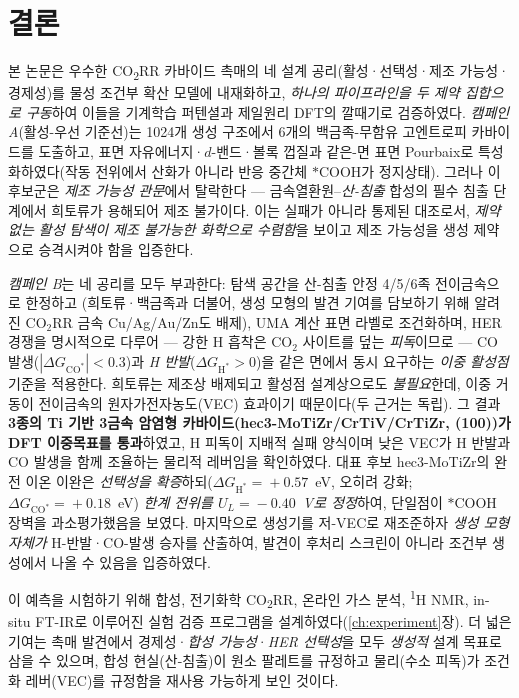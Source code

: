 \documentclass[11pt,a4paper]{report}
\newcommand{\dGCO}{\Delta G_{\mathrm{CO^*}}}
\newcommand{\dGH}{\Delta G_{\mathrm{H^*}}}
\begin{document}
\chapter{결론}
\label{ch:conclusion}

본 논문은 우수한 CO\textsubscript{2}RR 카바이드 촉매의 네 설계 공리(활성·선택성·제조 가능성·경제성)를
물성 조건부 확산 모델에 내재화하고, \emph{하나의 파이프라인을 두 제약 집합으로 구동}하여 이들을
기계학습 퍼텐셜과 제일원리 DFT의 깔때기로 검증하였다. \emph{캠페인 A}(활성-우선 기준선)는 1024개
생성 구조에서 6개의 백금족-무함유 고엔트로피 카바이드를 도출하고, 표면 자유에너지·$d$-밴드·볼록 껍질과
같은-면 표면 Pourbaix로 특성화하였다(작동 전위에서 산화가 아니라 반응 중간체 $*$COOH가 정지상태). 그러나
이 후보군은 \emph{제조 가능성 관문}에서 탈락한다 --- 금속열환원--\emph{산-침출} 합성의 필수 침출 단계에서
희토류가 용해되어 제조 불가이다. 이는 실패가 아니라 통제된 대조로서, \emph{제약 없는 활성 탐색이 제조
불가능한 화학으로 수렴함}을 보이고 제조 가능성을 생성 제약으로 승격시켜야 함을 입증한다.

\emph{캠페인 B}는 네 공리를 모두 부과한다: 탐색 공간을 산-침출 안정 4/5/6족 전이금속으로 한정하고
(희토류·백금족과 더불어, 생성 모형의 발견 기여를 담보하기 위해 알려진 CO$_2$RR 금속 Cu/Ag/Au/Zn도
배제), UMA 계산 표면 라벨로 조건화하며, HER 경쟁을 명시적으로 다루어 --- 강한 H 흡착은 CO$_2$ 사이트를
덮는 \emph{피독}이므로 --- CO 발생($|\dGCO|<0.3$)과 \emph{H 반발}($\dGH>0$)을 같은 면에서 동시 요구하는
\emph{이중 활성점} 기준을 적용한다. 희토류는 제조상 배제되고 활성점 설계상으로도 \emph{불필요}한데, 이중
거동이 전이금속의 원자가전자농도(VEC) 효과이기 때문이다(두 근거는 독립). 그 결과 \textbf{3종의 Ti 기반
3금속 암염형 카바이드(hec3-MoTiZr/CrTiV/CrTiZr, (100))가 DFT 이중목표를 통과}하였고, H 피독이 지배적
실패 양식이며 낮은 VEC가 H 반발과 CO 발생을 함께 조율하는 물리적 레버임을 확인하였다. 대표 후보
hec3-MoTiZr의 완전 이온 이완은 \emph{선택성을 확증}하되($\dGH\!=\!+0.57$~eV, 오히려 강화;
$\dGCO\!=\!+0.18$~eV) \emph{한계 전위를 $U_L\!=\!-0.40$~V로 정정}하여, 단일점이 $*$COOH 장벽을
과소평가했음을 보였다. 마지막으로 생성기를 저-VEC로 재조준하자 \emph{생성 모형 자체가} H-반발·CO-발생
승자를 산출하여, 발견이 후처리 스크린이 아니라 조건부 생성에서 나올 수 있음을 입증하였다.

이 예측을 시험하기 위해 합성, 전기화학 CO\textsubscript{2}RR, 온라인 가스 분석, \textsuperscript{1}H NMR,
in-situ FT-IR로 이루어진 실험 검증 프로그램을 설계하였다(\ref{ch:experiment}장). 더 넓은 기여는 촉매
발견에서 경제성·\emph{합성 가능성}·\emph{HER 선택성}을 모두 \emph{생성적} 설계 목표로 삼을 수 있으며,
합성 현실(산-침출)이 원소 팔레트를 규정하고 물리(수소 피독)가 조건화 레버(VEC)를 규정함을 재사용 가능하게
보인 것이다.
\end{document}
